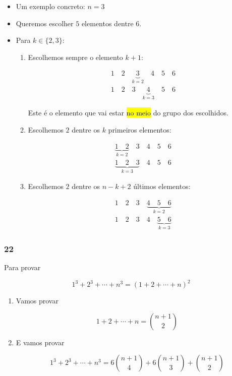 \documentclass[
  11pt]{report}
\begin{document}
\begin{itemize}
\item
  Um exemplo concreto: $n = 3$
\item
  Queremos escolher $5$ elementos dentre $6$.
\item
  Para $k \in \{ 2, 3 \}$:

  \begin{enumerate}
  \def\labelenumi{\arabic{enumi}.}
  \item
    Escolhemos sempre o elemento $k + 1$:

    \[
    \begin{aligned}
    1 \quad 2 \quad \underbrace{3}_{k = 2} \quad 4 \quad 5 \quad 6 \\
    1 \quad 2 \quad 3 \quad \underbrace{4}_{k = 3} \quad 5 \quad 6
    \end{aligned}
    \]

    Este é o elemento que vai estar {\hl{no meio}} do grupo dos escolhidos.
  \item
    Escolhemos $2$ dentre os $k$ primeiros elementos:

    \[
    \begin{aligned}
    \underbrace{1 \quad 2}_{k = 2} \quad 3 \quad 4 \quad 5 \quad 6 \\
    \underbrace{1 \quad 2 \quad 3}_{k = 3} \quad 4 \quad 5 \quad 6
    \end{aligned}
    \]
  \item
    Escolhemos $2$ dentre os $n - k + 2$ últimos elementos:

    \[
    \begin{aligned}
    1 \quad 2 \quad 3 \quad \underbrace{4 \quad 5 \quad 6}_{k = 2}\\
    1 \quad 2 \quad 3 \quad 4 \quad \underbrace{5 \quad 6}_{k = 3}
    \end{aligned}
    \]
  \end{enumerate}
\end{itemize}

\hypertarget{section-4}{%
\subsubsection*{22}\label{section-4}}

\begin{rmdbox}

Para provar

\[
1^3 + 2^3 + \cdots + n^3 = (1 + 2 + \cdots + n)^2
\]

\begin{enumerate}
\def\labelenumi{\alph{enumi}.}
\item
  Vamos provar

  \[
  1 + 2 + \cdots + n = \binom{n+1}{2}
  \]
\item
  E vamos provar

  \[
  1^3 + 2^3 + \cdots + n^3 = 
  6\binom{n+1}{4} + 6\binom{n+1}{3} + \binom{n+1}{2}
  \]
\end{enumerate}

\end{rmdbox}
\end{document}
